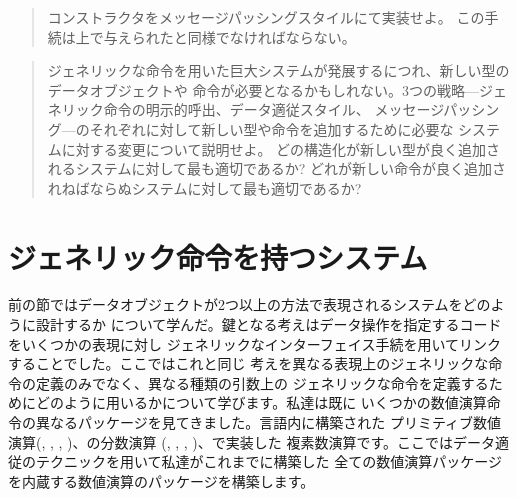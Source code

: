 \begin{quote}
コンストラクタをメッセージパッシングスタイルにて実装せよ。
この手続は上で与えられたと同様でなければならない。
\end{quote}

\begin{quote}
ジェネリックな命令を用いた巨大システムが発展するにつれ、新しい型のデータオブジェクトや
命令が必要となるかもしれない。3つの戦略---ジェネリック命令の明示的呼出、データ適従スタイル、
メッセージパッシング---のそれぞれに対して新しい型や命令を追加するために必要な
システムに対する変更について説明せよ。
どの構造化が新しい型が良く追加されるシステムに対して最も適切であるか?
どれが新しい命令が良く追加されねばならぬシステムに対して最も適切であるか?
\end{quote}

\section{ジェネリック命令を持つシステム}
\label{Section 2.5}



前の節ではデータオブジェクトが2つ以上の方法で表現されるシステムをどのように設計するか
について学んだ。鍵となる考えはデータ操作を指定するコードをいくつかの表現に対し
ジェネリックなインターフェイス手続を用いてリンクすることでした。ここではこれと同じ
考えを異なる表現上のジェネリックな命令の定義のみでなく、異なる種類の引数上の
ジェネリックな命令を定義するためにどのように用いるかについて学びます。私達は既に
いくつかの数値演算命令の異なるパッケージを見てきました。言語内に構築された
プリミティブ数値演算(\code{+}, \code{-}, \code{*}, \code{/})、の分数演算
(, , , )、で実装した
複素数演算です。ここではデータ適従のテクニックを用いて私達がこれまでに構築した
全ての数値演算パッケージを内蔵する数値演算のパッケージを構築します。


